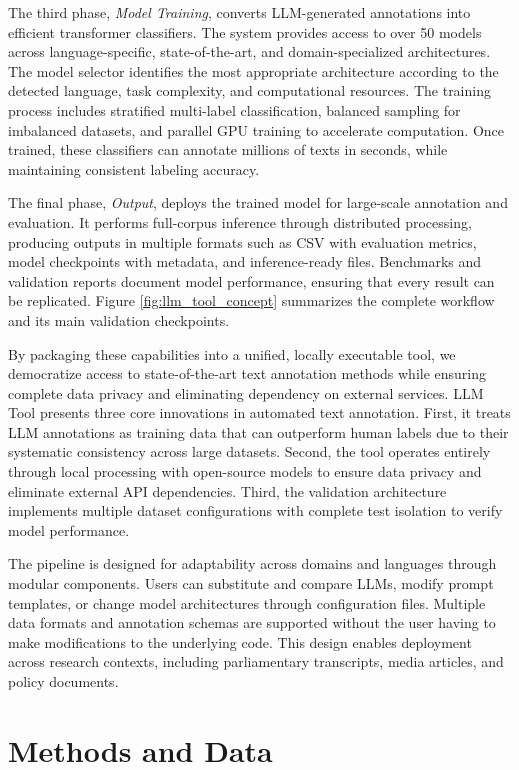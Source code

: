 \documentclass[12pt]{article}
\begin{document}
The third phase, \emph{Model Training}, converts LLM-generated annotations into efficient transformer classifiers. The system provides access to over 50 models across language-specific, state-of-the-art, and domain-specialized architectures. The model selector identifies the most appropriate architecture according to the detected language, task complexity, and computational resources. The training process includes stratified multi-label classification, balanced sampling for imbalanced datasets, and parallel GPU training to accelerate computation. Once trained, these classifiers can annotate millions of texts in seconds, while maintaining consistent labeling accuracy.

The final phase, \emph{Output}, deploys the trained model for large-scale annotation and evaluation. It performs full-corpus inference through distributed processing, producing outputs in multiple formats such as CSV with evaluation metrics, model checkpoints with metadata, and inference-ready files. Benchmarks and validation reports document model performance, ensuring that every result can be replicated. Figure \ref{fig:llm_tool_concept} summarizes the complete workflow and its main validation checkpoints.

By packaging these capabilities into a unified, locally executable tool, we democratize access to state-of-the-art text annotation methods while ensuring complete data privacy and eliminating dependency on external services. LLM Tool presents three core innovations in automated text annotation. First, it treats LLM annotations as training data that can outperform human labels due to their systematic consistency across large datasets. Second, the tool operates entirely through local processing with open-source models to ensure data privacy and eliminate external API dependencies. Third, the validation architecture implements multiple dataset configurations with complete test isolation to verify model performance.

The pipeline is designed for adaptability across domains and languages through modular components. Users can substitute and compare LLMs, modify prompt templates, or change model architectures through configuration files. Multiple data formats and annotation schemas are supported without the user having to make modifications to the underlying code. This design enables deployment across research contexts, including parliamentary transcripts, media articles, and policy documents.

\newpage
\section{Methods and Data}
\end{document}
